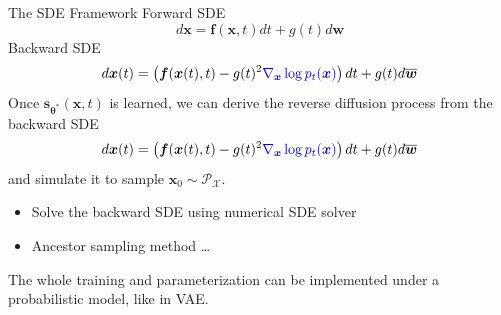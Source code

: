 \documentclass[10pt,xcolor={usenames,dvipsnames,table},aspectratio=169]{beamer}
\begin{document}
\begin{frame}{The SDE Framework}
Forward SDE
\[
d \bm{x} = \bm{f}(\bm{x}, t) dt + g(t) d \bm{w}
\] 
Backward SDE
\[
d \bm{x}(t) = \left( \bm{f}(\bm{x}(t), t) - g(t)^2 {\color{blue} \nabla_{\bm{x}} \log p_{t}(\bm{x})} \right)dt  + g(t)d \overline{\bm{w}}
\] 
Once $\bm{s}_{\boldsymbol \theta^{*}}(\bm{x}, t)$ is learned, we can derive the reverse diffusion process from the backward SDE
\[
d \bm{x}(t) = \left( \bm{f}(\bm{x}(t), t) - g(t)^2 {\color{blue} \nabla_{\bm{x}} \log p_{t}(\bm{x})} \right)dt  + g(t)d \overline{\bm{w}}
\] 
and simulate it to sample $\bm{x}_0 \sim \mathcal{P}_{\mathcal{X}}$.
\begin{itemize}
    \item Solve the backward SDE using numerical SDE solver
    \item Ancestor sampling method \ldots 
\end{itemize}

The whole training and parameterization can be implemented under a probabilistic model, like in VAE.

\end{frame}
\end{document}
